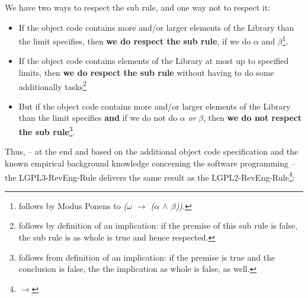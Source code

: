 We have two ways to respect the sub rule, and one way not to respect it:
\begin{itemize}
  \item If the object code contains more and/or larger elements of the Library
  than the limit specifies, then \textbf{we do respect the sub rule}, if we do
  $\alpha$ and $\beta$\footnote{follows by Modus Ponens to \emph{($\omega$
  $\rightarrow$ ($\alpha$ $\wedge$ $\beta$))}.}.
  \item If the object code contains elements of the Library at most up to
  specified limits, then \textbf{we do respect the sub rule} without having to
  do some additionally tasks\footnote{follows by definition of an implication:
  if the premise of this sub rule is false, the sub rule is as whole is true and
  hence respected.}
  \item But if the object code contains more and/or larger elements of the
  Library than the limit specifies \textbf{and} if we do not do $\alpha$
  \emph{or} $\beta$, then \textbf{we do not respect the sub
  rule}\footnote{follows from definition of an implication: if the premise is
  true and the conclusion is false, the the implication as whole is false, as
  well.}.
\end{itemize}

Thus, -- at the end and based on the additional object code specification and
the known empirical background knowledge concerning the software programming --
the LGPL3-RevEng-Rule delivers the same result as the
LGPL2-RevEng-Rule\footnote{$\rightarrow$
\pageref{RevEngLgpl2ComplianceByRenverseEngine}}:

